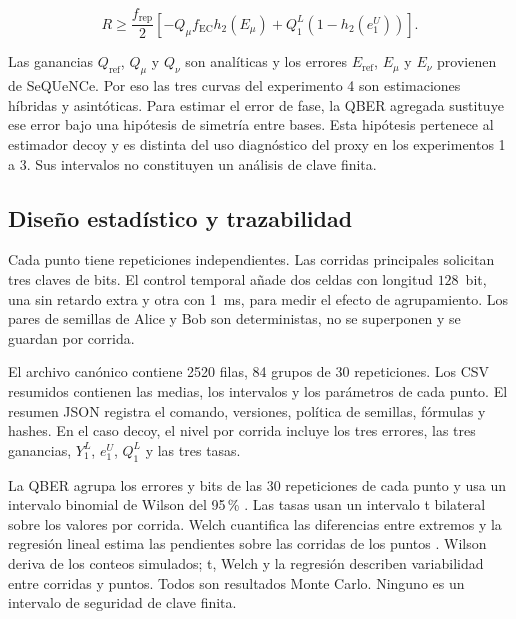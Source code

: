 \documentclass[12pt,a4paper]{article}
\newcommand{\hbin}[1]{h_2\!\left(#1\right)}
\begin{document}
\begin{equation}
  R\geq\frac{f_{\mathrm{rep}}}{2}
  \left[-Q_\mu f_{\mathrm{EC}}\hbin{E_\mu}
  +Q_1^L\left(1-\hbin{e_1^U}\right)\right].
  \label{eq:decoy-rate}
\end{equation}

Las ganancias \(Q_{\mathrm{ref}}\), \(Q_\mu\) y \(Q_\nu\) son analíticas y
los errores \(E_{\mathrm{ref}}\), \(E_\mu\) y \(E_\nu\) provienen de
SeQUeNCe. Por eso las tres curvas del experimento 4 son estimaciones híbridas y
asintóticas. Para estimar el error de fase, la QBER agregada sustituye ese error
bajo una hipótesis de simetría entre bases. Esta hipótesis pertenece al
estimador decoy y es distinta del uso diagnóstico del proxy en los experimentos
1 a 3. Sus intervalos no constituyen un análisis de clave finita.

\subsection*{Diseño estadístico y trazabilidad}

Cada punto tiene \PThreeRepetitions{} repeticiones independientes. Las corridas
principales solicitan tres claves de \PThreeKeyBits{} bits. El control temporal
añade dos celdas con longitud \(128\)~bit, una sin retardo extra y otra con
\SI{1}{\milli\second}, para medir el efecto de agrupamiento. Los pares de
semillas de Alice y Bob son deterministas, no se superponen y se guardan por
corrida.

El archivo canónico  contiene
2520 filas, 84 grupos de 30 repeticiones. Los CSV resumidos contienen las medias,
los intervalos y los parámetros de cada punto. El resumen JSON registra el
comando, versiones, política de semillas, fórmulas y hashes. En el caso decoy,
el nivel por corrida incluye los tres errores, las tres ganancias,
\(Y_1^L\), \(e_1^U\), \(Q_1^L\) y las tres tasas.

La QBER agrupa los errores y bits de las 30 repeticiones de cada punto y usa un
intervalo binomial de Wilson del 95\,\% \cite{wilson1927}. Las tasas usan un
intervalo t bilateral sobre los valores por corrida. Welch cuantifica las
diferencias entre extremos y la regresión lineal estima las pendientes sobre
las corridas de los puntos \cite{welch1947}. Wilson deriva de los conteos
simulados; t, Welch y la regresión describen variabilidad entre corridas y
puntos. Todos son resultados Monte Carlo. Ninguno es un intervalo de seguridad
de clave finita.
\end{document}
